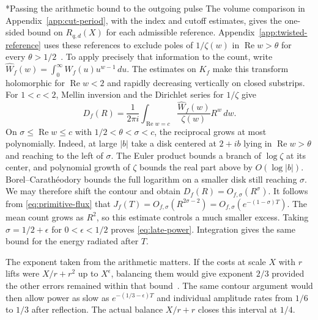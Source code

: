 \documentclass[11pt,letterpaper]{article}
\makeatletter
\renewcommand\subsection{\@startsection{subsection}{2}{\z@}{-2.0ex plus -.3ex}{.75ex}{\normalfont\normalsize\itshape}}
\numberwithin{equation}{section}
\makeatother
\begin{document}
\subsection*{Passing the arithmetic bound to the outgoing pulse}
The volume comparison in Appendix~\ref{app:cut-period}, with the index and cutoff estimates, gives the one-sided bound on $R_{q,d}(X)$ for each admissible reference. Appendix~\ref{app:twisted-reference} uses these references to exclude poles of $1/\zeta(w)$ in $\operatorname{Re}w>\theta$ for every $\theta>1/2$~\cite{volumelean,twistlean}. To apply precisely that information to the count, write $\widehat W_f(w)=\int_0^\infty W_f(u)u^{w-1}\,du$. The estimates on $K_f$ make this transform holomorphic for $\operatorname{Re}w<2$ and rapidly decreasing vertically on closed substrips. For $1<c<2$, Mellin inversion and the Dirichlet series for $1/\zeta$ give
\[
 D_f(R)=\frac{1}{2\pi i}\int_{\operatorname{Re}w=c}
            \frac{\widehat W_f(w)}{\zeta(w)}R^w\,dw .
\]
On $\sigma\le\operatorname{Re}w\le c$ with $1/2<\theta<\sigma<c$, the reciprocal grows at most polynomially. Indeed, at large $|b|$ take a disk centered at $2+ib$ lying in $\operatorname{Re}w>\theta$ and reaching to the left of $\sigma$. The Euler product bounds a branch of $\log\zeta$ at its center, and polynomial growth of $\zeta$ bounds the real part above by $O(\log|b|)$. Borel--Carath\'eodory bounds the full logarithm on a smaller disk still reaching $\sigma$. We may therefore shift the contour and obtain $D_f(R)=O_{f,\sigma}(R^\sigma)$. It follows from \eqref{eq:primitive-flux} that $J_f(T)=O_{f,\sigma}(R^{2\sigma-2})=O_{f,\sigma}(e^{-(1-\sigma)T})$. The mean count grows as $R^2$, so this estimate controls a much smaller excess. Taking $\sigma=1/2+\epsilon$ for $0<\epsilon<1/2$ proves \eqref{eq:late-power}. Integration gives the same bound for the energy radiated after $T$.

The exponent taken from the arithmetic matters. If the costs at scale $X$ with $r$ lifts were $X/r+r^2$ up to $X^\epsilon$, balancing them would give exponent $2/3$ provided the other errors remained within that bound~\cite[\S I.8]{primeguide}. The same contour argument would then allow power as slow as $e^{-(1/3-\epsilon)T}$ and individual amplitude rates from $1/6$ to $1/3$ after reflection. The actual balance $X/r+r$ closes this interval at $1/4$.
\end{document}
